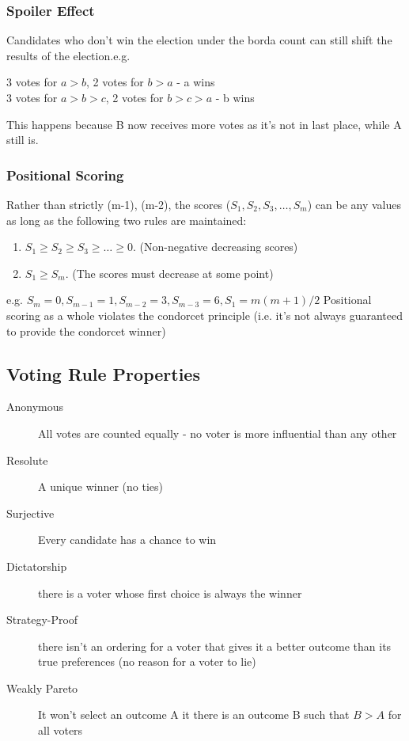 \subsubsection{Spoiler Effect}
Candidates who don't win the election under the borda count can still shift the results of the election.e.g.
\begin{center}
    3 votes for $a>b$, 2 votes for $b>a$ - a wins \\
    3 votes for $a>b>c$, 2 votes for $b>c>a$ - b wins 
\end{center}
This happens because B now receives more votes as it's not in last place, while A still is. 

\subsubsection{Positional Scoring}
Rather than strictly (m-1), (m-2), the scores ($S_1,S_2,S_3,\dots,S_m$) can be any values as long as the following two rules are maintained:
\begin{enumerate}
    \item $S_1 \geq S_2 \geq S_3 \geq \dots \geq 0$. (Non-negative decreasing scores)
    \item $S_1 \ge S_m$. (The scores must decrease at some point) 
\end{enumerate}
e.g. $S_m = 0, S_{m-1} = 1, S_{m-2} = 3, S_{m-3} = 6, S_1 = m (m+1)/2$
Positional scoring as a whole violates the condorcet principle (i.e. it's not always guaranteed to provide the condorcet winner)

\subsection{Voting Rule Properties}
\begin{description}
    \item[Anonymous] All votes are counted equally  - no voter is more influential than any other
    \item[Resolute] A unique winner (no ties)
    \item[Surjective] Every candidate has a chance to win
    \item[Dictatorship] there is a voter whose first choice is always the winner
    \item[Strategy-Proof] there isn't an ordering for a voter that gives it a better outcome than its true preferences (no reason for a voter to lie)
    \item[Weakly Pareto] It won't select an outcome A it there is an outcome B such that $B>A$ for all voters
\end{description}

